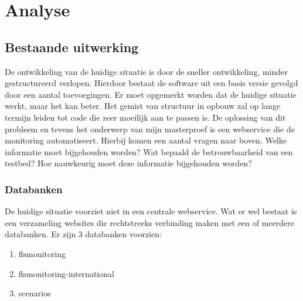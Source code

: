 \newpage
\chapter{Analyse}

\section{Bestaande uitwerking}
\npar
De ontwikkeling van de huidige situatie is door de sneller ontwikkeling, minder gestructureerd verlopen.
Hierdoor bestaat de software uit een basis versie gevolgd door een aantal  toevoegingen. Er moet opgemerkt worden dat de huidige situatie werkt, maar het kan beter. Het gemist van structuur in opbouw zal op lange termijn leiden tot code die zeer moeilijk aan te passen is.
\npar
De oplossing van dit probleem en tevens het onderwerp van mijn masterproef is een webservice die de monitoring automatiseert. Hierbij komen een aantal vragen naar boven. Welke informatie moet bijgehouden worden? 
Wat bepaald de betrouwbaarheid van een testbed? Hoe nauwkeurig moet deze informatie bijgehouden worden? 

\subsection{Databanken}
\npar
De huidige situatie voorziet niet in een centrale webservice.
Wat er wel bestaat is een verzameling websites die rechtstreeks verbinding maken met een of meerdere databanken. Er zijn 3 databanken voorzien:
\begin{enumerate}
\item flsmonitoring
\item flsmonitoring-international
\item scenarios
\end{enumerate}
\newpage
